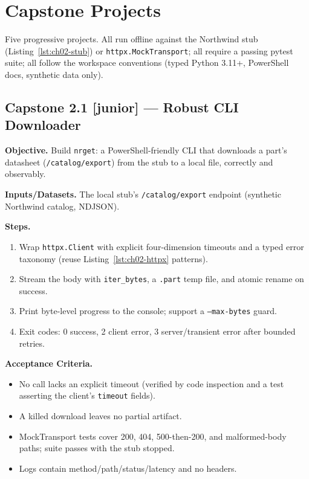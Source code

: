 
\section{Capstone Projects}
\label{sec:ch02-capstones}

Five progressive projects. All run offline against the Northwind stub
(Listing~\ref{lst:ch02-stub}) or \texttt{httpx.MockTransport}; all require a
passing pytest suite; all follow the workspace conventions (typed Python
3.11+, PowerShell docs, synthetic data only).

\subsection{Capstone 2.1 [junior] --- Robust CLI Downloader}

\textbf{Objective.} Build \texttt{nrget}: a PowerShell-friendly CLI that
downloads a part's datasheet (\texttt{/catalog/export}) from the stub to a
local file, correctly and observably.

\textbf{Inputs/Datasets.} The local stub's \texttt{/catalog/export} endpoint
(synthetic Northwind catalog, NDJSON).

\textbf{Steps.}
\begin{enumerate}
  \item Wrap \texttt{httpx.Client} with explicit four-dimension timeouts and
        a typed error taxonomy (reuse Listing~\ref{lst:ch02-httpx} patterns).
  \item Stream the body with \texttt{iter\_bytes}, a \texttt{.part} temp
        file, and atomic rename on success.
  \item Print byte-level progress to the console; support a
        \texttt{--max-bytes} guard.
  \item Exit codes: 0 success, 2 client error, 3 server/transient error
        after bounded retries.
\end{enumerate}

\textbf{Acceptance Criteria.}
\begin{itemize}
  \item[$\square$] No call lacks an explicit timeout (verified by code
        inspection and a test asserting the client's \texttt{timeout} fields).
  \item[$\square$] A killed download leaves no partial artifact.
  \item[$\square$] MockTransport tests cover 200, 404, 500-then-200, and
        malformed-body paths; suite passes with the stub stopped.
  \item[$\square$] Logs contain method/path/status/latency and no headers.
\end{itemize}

